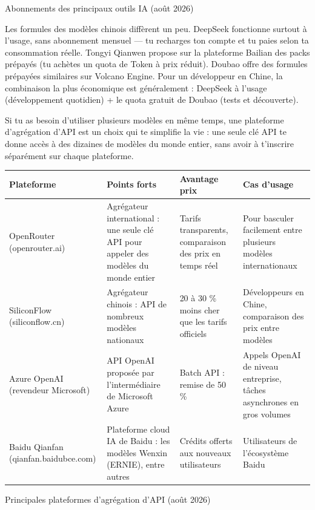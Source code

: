 \begin{center}\small\color{gray}Abonnements des principaux outils IA (août 2026)\end{center}

Les formules des modèles chinois diffèrent un peu. DeepSeek fonctionne surtout à l'usage, sans abonnement mensuel — tu recharges ton compte et tu paies selon ta consommation réelle. Tongyi Qianwen propose sur la plateforme Bailian des packs prépayés (tu achètes un quota de Token à prix réduit). Doubao offre des formules prépayées similaires sur Volcano Engine. Pour un développeur en Chine, la combinaison la plus économique est généralement : DeepSeek à l'usage (développement quotidien) + le quota gratuit de Doubao (tests et découverte).


Si tu as besoin d'utiliser plusieurs modèles en même temps, une plateforme d'agrégation d'API est un choix qui te simplifie la vie : une seule clé API te donne accès à des dizaines de modèles du monde entier, sans avoir à t'inscrire séparément sur chaque plateforme.

\begin{center}
\begin{tabularx}{\linewidth}{|X|X|X|X|}
\hline
\textbf{Plateforme} & \textbf{Points forts} & \textbf{Avantage prix} & \textbf{Cas d'usage} \tabularnewline
\hline
OpenRouter (openrouter.ai) & Agrégateur international : une seule clé API pour appeler des modèles du monde entier & Tarifs transparents, comparaison des prix en temps réel & Pour basculer facilement entre plusieurs modèles internationaux \tabularnewline
SiliconFlow (siliconflow.cn) & Agrégateur chinois : API de nombreux modèles nationaux & 20 à 30 \% moins cher que les tarifs officiels & Développeurs en Chine, comparaison des prix entre modèles \tabularnewline
Azure OpenAI (revendeur Microsoft) & API OpenAI proposée par l'intermédiaire de Microsoft Azure & Batch API : remise de 50 \% & Appels OpenAI de niveau entreprise, tâches asynchrones en gros volumes \tabularnewline
Baidu Qianfan (qianfan.baidubce.com) & Plateforme cloud IA de Baidu : les modèles Wenxin (ERNIE), entre autres & Crédits offerts aux nouveaux utilisateurs & Utilisateurs de l'écosystème Baidu \tabularnewline
\hline
\end{tabularx}
\end{center}

\begin{center}\small\color{gray}Principales plateformes d'agrégation d'API (août 2026)\end{center}

